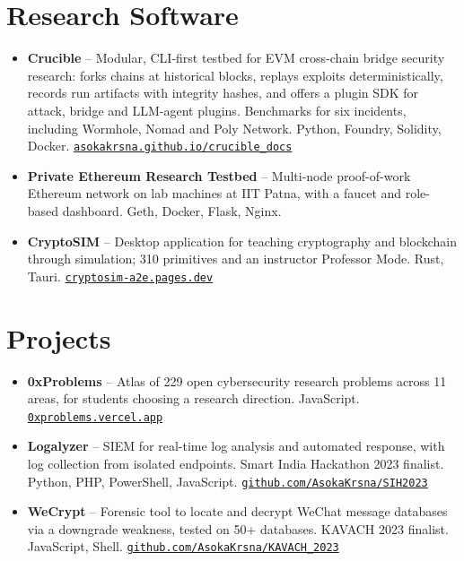 \documentclass[10pt]{article}
\begin{document}
\section{Research Software}
\begin{itemize}
  \item \textbf{Crucible} -- Modular, CLI-first testbed for EVM cross-chain bridge security research: forks chains at historical blocks, replays exploits deterministically, records run artifacts with integrity hashes, and offers a plugin SDK for attack, bridge and LLM-agent plugins. Benchmarks for six incidents, including Wormhole, Nomad and Poly Network. Python, Foundry, Solidity, Docker. \href{https://asokakrsna.github.io/crucible\_docs/}{\nolinkurl{asokakrsna.github.io/crucible\_docs}}
  \item \textbf{Private Ethereum Research Testbed} -- Multi-node proof-of-work Ethereum network on lab machines at IIT Patna, with a faucet and role-based dashboard. Geth, Docker, Flask, Nginx.
  \item \textbf{CryptoSIM} -- Desktop application for teaching cryptography and blockchain through simulation; 310 primitives and an instructor Professor Mode. Rust, Tauri. \href{https://cryptosim-a2e.pages.dev/}{\nolinkurl{cryptosim-a2e.pages.dev}}
\end{itemize}

\section{Projects}
\begin{itemize}
  \item \textbf{0xProblems} -- Atlas of 229 open cybersecurity research problems across 11 areas, for students choosing a research direction. JavaScript. \href{https://0xproblems.vercel.app/}{\nolinkurl{0xproblems.vercel.app}}
  \item \textbf{Logalyzer} -- SIEM for real-time log analysis and automated response, with log collection from isolated endpoints. Smart India Hackathon 2023 finalist. Python, PHP, PowerShell, JavaScript. \href{https://github.com/AsokaKrsna/SIH2023}{\nolinkurl{github.com/AsokaKrsna/SIH2023}}
  \item \textbf{WeCrypt} -- Forensic tool to locate and decrypt WeChat message databases via a downgrade weakness, tested on 50+ databases. KAVACH 2023 finalist. JavaScript, Shell. \href{https://github.com/AsokaKrsna/KAVACH\_2023}{\nolinkurl{github.com/AsokaKrsna/KAVACH\_2023}}
\end{itemize}
\end{document}
